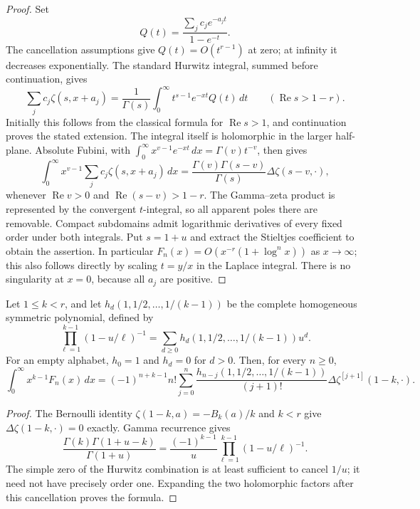 \begin{proof}
Set
\[
 Q(t)=\frac{\sum_jc_je^{-a_jt}}{1-e^{-t}}.
\]
The cancellation assumptions give $Q(t)=O(t^{r-1})$ at zero;
at infinity it decreases exponentially. The standard Hurwitz integral,
summed before continuation, gives
\[
 \sum_jc_j\zeta(s,x+a_j)
 =\frac1{\Gamma(s)}\int_0^\infty t^{s-1}e^{-xt}Q(t)\,dt
 \qquad(\operatorname{Re}s>1-r).
\]
Initially this follows from the classical formula for
$\operatorname{Re}s>1$, and continuation proves the stated extension.
The integral itself is holomorphic in the larger half-plane.
Absolute Fubini, with
$\int_0^\infty x^{v-1}e^{-xt}\,dx=\Gamma(v)t^{-v}$,
then gives
\[
 \int_0^\infty x^{v-1}\sum_jc_j\zeta(s,x+a_j)\,dx
 =\frac{\Gamma(v)\Gamma(s-v)}{\Gamma(s)}
       \Delta\zeta(s-v,\cdot),
\]
whenever $\operatorname{Re}v>0$ and
$\operatorname{Re}(s-v)>1-r$. The Gamma--zeta product is represented
by the convergent $t$-integral, so all apparent poles there are
removable. Compact subdomains admit logarithmic derivatives of every
fixed order under both integrals. Put $s=1+u$ and extract the
Stieltjes coefficient to obtain the assertion.
In particular $F_n(x)=O(x^{-r}(1+\log^n x))$ as $x\to\infty$;
this also follows directly by scaling $t=y/x$ in the Laplace integral.
There is no singularity at $x=0$, because all $a_j$ are positive.
\end{proof}

\begin{corollary}
Let $1\le k<r$, and let $h_d(1,1/2,\ldots,1/(k-1))$ be the complete
homogeneous symmetric polynomial, defined by
\[
 \prod_{\ell=1}^{k-1}(1-u/\ell)^{-1}
 =\sum_{d\ge0}h_d(1,1/2,\ldots,1/(k-1))u^d.
\]
For an empty alphabet, $h_0=1$ and $h_d=0$ for $d>0$.
Then, for every $n\ge0$,
\begin{equation}\label{stmell:integer}
 \int_0^\infty x^{k-1}F_n(x)\,dx
 =(-1)^{n+k-1}n!\sum_{j=0}^n
 \frac{h_{n-j}(1,1/2,\ldots,1/(k-1))}{(j+1)!}
 \Delta\zeta^{[j+1]}(1-k,\cdot).
\end{equation}
\end{corollary}
\begin{proof}
The Bernoulli identity
$\zeta(1-k,a)=-B_k(a)/k$ and $k<r$ give
$\Delta\zeta(1-k,\cdot)=0$ exactly. Gamma recurrence gives
\[
 \frac{\Gamma(k)\Gamma(1+u-k)}{\Gamma(1+u)}
 =\frac{(-1)^{k-1}}u
       \prod_{\ell=1}^{k-1}(1-u/\ell)^{-1}.
\]
The simple zero of the Hurwitz combination is at least sufficient to
cancel $1/u$; it need not have precisely order one. Expanding the two
holomorphic factors after this cancellation proves the formula.
\end{proof}

